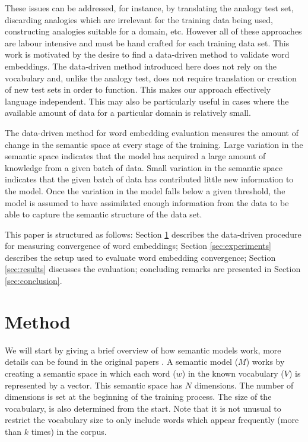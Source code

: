 \documentclass{article} %
\begin{document}
These issues can be addressed, for instance, by translating the analogy test set, discarding analogies which are irrelevant for the training data being used, constructing analogies suitable for a domain, etc. However all of these approaches are labour intensive and must be hand crafted for each training data set. This work is motivated by the desire to find a data-driven method to validate word embeddings. The data-driven method introduced here does not rely on the vocabulary and, unlike the analogy test, does not require translation or creation of new test sets in order to function. This makes our approach effectively language independent. This may also be particularly useful in cases where the available amount of data for a particular domain is relatively small.

The data-driven method for word embedding evaluation measures the amount of change in the semantic space at every stage of the training. Large variation in the semantic space indicates that the model has acquired a large amount of knowledge from a given batch of data. Small variation in the semantic space indicates that the given batch of data has contributed little new information to the model. Once the variation in the model falls below a given threshold, the model is assumed to have assimilated enough information from the data to be able to capture the semantic structure of the data set.

This paper is structured as follows: Section \ref{sec:method} describes the data-driven procedure for measuring convergence of word embeddings; Section \ref{sec:experiments} describes the setup used to evaluate word embedding convergence; Section \ref{sec:results} discusses the evaluation; concluding remarks are presented in Section \ref{sec:conclusion}.

\section{Method}
\label{sec:method}

We will start by giving a brief overview of how semantic models work, more details can be found in the original papers \cite{Mikolov_CS2013}. A semantic model ($M$) works by creating a semantic space in which each word ($w$) in the known vocabulary ($V$) is represented by a vector. This semantic space has $N$ dimensions. The number of dimensions is set at the beginning of the training process. The size of the vocabulary, is also determined from the start. Note that it is not unusual to restrict the vocabulary size to only include words which appear frequently (more than $k$ times) in the corpus.
\end{document}
